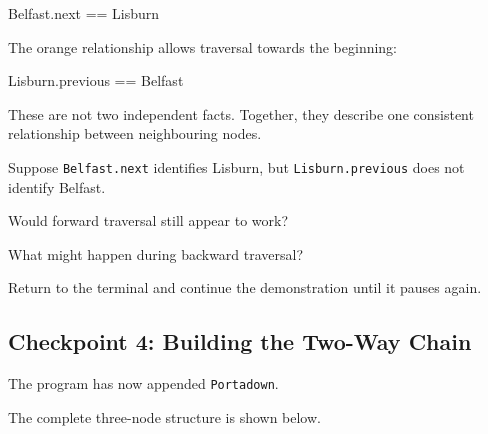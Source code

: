 \documentclass{csc2059practical}
\begin{document}
\begin{cppcode}
Belfast.next == Lisburn
\end{cppcode}

The orange relationship allows traversal towards the beginning:

\begin{cppcode}
Lisburn.previous == Belfast
\end{cppcode}

These are not two independent facts. Together, they describe one consistent relationship between neighbouring nodes.

\begin{reflectionbox}
Suppose \texttt{Belfast.next} identifies Lisburn, but
\texttt{Lisburn.previous} does not identify Belfast.

Would forward traversal still appear to work?

What might happen during backward traversal?
\end{reflectionbox}

Return to the terminal and continue the demonstration until it pauses again.

\subsection{Checkpoint 4: Building the Two-Way Chain}

The program has now appended \texttt{Portadown}.

The complete three-node structure is shown below.
\end{document}
